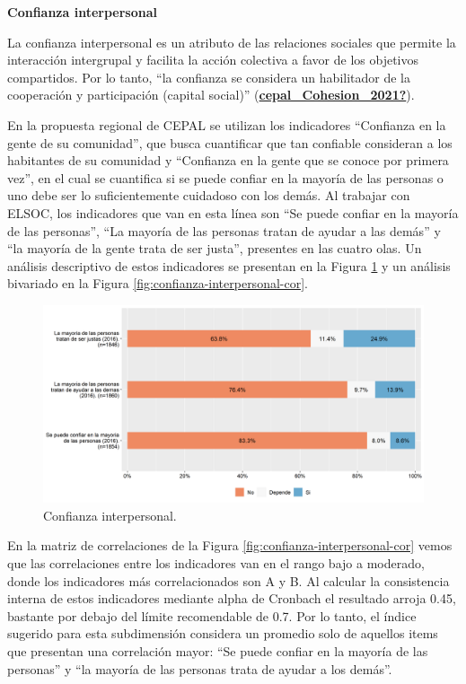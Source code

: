 \documentclass[
  12pt,
]{book}
\begin{document}
\textbf{Confianza interpersonal}

La confianza interpersonal es un atributo de las relaciones sociales que permite la interacción intergrupal y facilita la acción colectiva a favor de los objetivos compartidos. Por lo tanto, ``la confianza se considera un habilitador de la cooperación y participación (capital social)'' (\protect\hyperlink{ref-cepal_Cohesion_2021}{\textbf{cepal\_Cohesion\_2021?}}).

En la propuesta regional de CEPAL se utilizan los indicadores ``Confianza en la gente de su comunidad'', que busca cuantificar que tan confiable consideran a los habitantes de su comunidad y ``Confianza en la gente que se conoce por primera vez'', en el cual se cuantifica si se puede confiar en la mayoría de las personas o uno debe ser lo suficientemente cuidadoso con los demás. Al trabajar con ELSOC, los indicadores que van en esta línea son ``Se puede confiar en la mayoría de las personas'', ``La mayoría de las personas tratan de ayudar a las demás'' y ``la mayoría de la gente trata de ser justa'', presentes en las cuatro olas. Un análisis descriptivo de estos indicadores se presentan en la Figura \ref{fig:confianza-interpersonal} y un análisis bivariado en la Figura \ref{fig:confianza-interpersonal-cor}.

\begin{figure}[H]

{\centering \includegraphics[width=1\linewidth,height=1\textheight]{output/graphs/confianza-interpersonal} 

}

\caption{Confianza interpersonal.}\label{fig:confianza-interpersonal}
\end{figure}

En la matriz de correlaciones de la Figura \ref{fig:confianza-interpersonal-cor} vemos que las correlaciones entre los indicadores van en el rango bajo a moderado, donde los indicadores más correlacionados son A y B. Al calcular la consistencia interna de estos indicadores mediante alpha de Cronbach el resultado arroja 0.45, bastante por debajo del límite recomendable de 0.7. Por lo tanto, el índice sugerido para esta subdimensión considera un promedio solo de aquellos items que presentan una correlación mayor: ``Se puede confiar en la mayoría de las personas'' y ``la mayoría de las personas trata de ayudar a los demás''.
\end{document}
